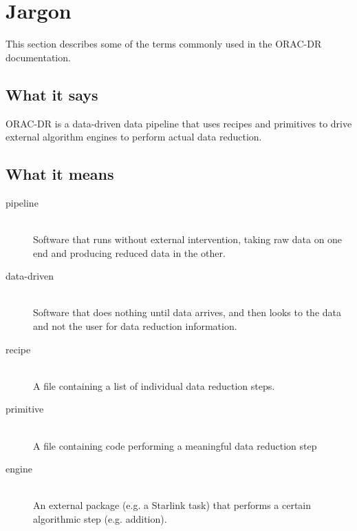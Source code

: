 \documentclass[twoside,11pt]{article}
\newcommand{\underscore}{\leavevmode\kern.04em\vbox{\hrule width 0.4em height 0.3pt}}
\newcommand{\xlabel}[1]{}
\renewcommand{\_}{\texttt{\symbol{95}}}
\begin{document}

\section{Jargon\xlabel{jargon}}%

This section describes some of the terms commonly used in
the ORAC-DR documentation.

\subsection*{What it says}%

ORAC-DR is a data-driven data pipeline that uses recipes and
primitives to drive external algorithm engines to perform actual data
reduction.

\subsection*{What it means}%

\begin{description}

\item[pipeline]%
%
\hfil\\
Software that runs without external intervention, taking raw data on
one end and producing reduced data in the other.

\item[data-driven]%
%
\hfil\\
Software that does nothing until data arrives, and then looks to 
the data and not the user for data reduction information.

\item[recipe]%
%
\hfil\\
A file containing a list of individual data reduction steps. 

\item[primitive]%
%
\hfil\\
A file containing code performing a meaningful data reduction step

\item[engine]%
%
\hfil\\
An external package (e.g. a Starlink task) that performs a certain
algorithmic step (e.g. addition).

\end{description}
\end{document}
